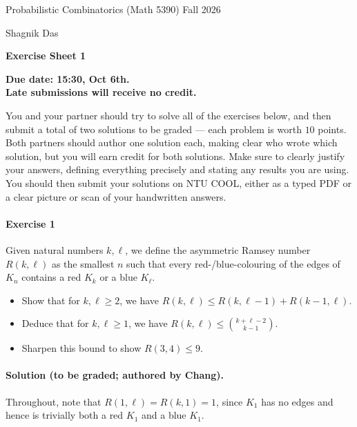 \documentclass[a4paper,12pt]{article}
\newcommand{\courseTitle}{Probabilistic Combinatorics (Math 5390)}
\newcommand{\semester}{Fall 2026}
\newcommand{\instructorA}{Shagnik Das}
\newcommand{\instructorB}{}
\newcommand{\sheetNumber}{1}
\newcommand{\dueDate}{15:30, Oct 6th.}
\newcommand{\lateWarning}{Late submissions will receive no credit.}
\newcommand{\buildtitle}[4]{
\begin{flushleft}
{\large
#1
\hfill{}
#2
\par
#3
}
\end{flushleft}
\vskip 4pt
\begin{center}
{\large\bfseries#4\par}
\end{center}
\bigskip
}
\begin{document}
\buildtitle{\courseTitle{}}{\semester}{\instructorA{} \hfill \instructorB{}}{Exercise Sheet \sheetNumber{}}

\vspace{-0.2in}

\begin{center}

{\bf Due date: \dueDate \\ \lateWarning}

\end{center}

\noindent You and your partner should try to solve all of the exercises below, and then submit a total of two solutions to be graded --- each problem is worth $10$ points. Both partners should author one solution each, making clear who wrote which solution, but you will earn credit for both solutions. Make sure to clearly justify your answers, defining everything precisely and stating any results you are using. You should then submit your solutions on NTU COOL, either as a typed PDF or a clear picture or scan of your handwritten answers.

\paragraph{Exercise 1}  Given natural numbers $k, \ell$, we define the asymmetric Ramsey number $R(k,\ell)$ as the smallest $n$ such that every red-/blue-colouring of the edges of $K_n$ contains a red $K_k$ or a blue $K_{\ell}$.
\begin{itemize}
	\item[(a)] Show that for $k, \ell \ge 2$, we have $R(k, \ell) \le R(k, \ell-1) + R(k-1, \ell)$.
	\item[(b)] Deduce that for $k, \ell \ge 1$, we have $R(k, \ell) \le \binom{k + \ell - 2}{k-1}$.
	\item[(c)] Sharpen this bound to show $R(3,4) \le 9$.
\end{itemize}

\paragraph{Solution (to be graded; authored by Chang).} Throughout, note that $R(1, \ell) = R(k, 1) = 1$, since $K_1$ has no edges and hence is trivially both a red $K_1$ and a blue $K_1$.
\end{document}
